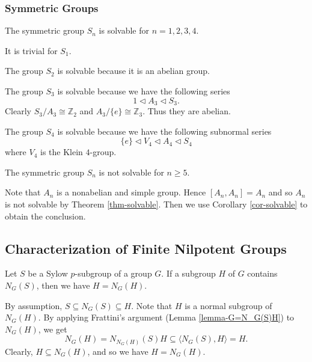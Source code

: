 \subsubsection{Symmetric Groups}
\begin{proposition}
	The symmetric group $S_n$ is solvable for $n=1,2,3,4$.
\end{proposition}
\begin{sketch} It is trivial for $S_1$.
	

	The group $S_2$ is solvable because it is an abelian group.
	
	The group $S_3$ is solvable because we have the following series
	\begin{equation*}
		1 \lhd A_3 \lhd S_3.
	\end{equation*}
	Clearly  $S_3/A_3\cong \mathbb{Z}_2$ and $A_3/\{e\} \cong \mathbb{Z}_3$. Thus they are abelian.  
	
	The group $S_4$ is solvable because we have the following subnormal series
	\begin{equation*}
		\{e\} \lhd V_4 \lhd A_4\lhd S_4
	\end{equation*}
	where $V_4$ is the Klein $4$-group.
\end{sketch}
\begin{proposition}
	The symmetric group $S_n$ is not solvable for $n\geq 5$.
\end{proposition}
\begin{sketch}
	Note that $A_n$ is a nonabelian and simple group. Hence $[A_n,A_n] = A_n$ and so $A_n$ is not solvable by Theorem \ref{thm-solvable}. Then we use Corollary \ref{cor-solvable} to obtain the conclusion.
\end{sketch}

\subsection{Characterization of Finite Nilpotent Groups}



\begin{lemma} \label{lemma-H=N_G(H)}
	Let $S$ be a Sylow $p$-subgroup of a group $G$. If a subgroup $H$ of $G$ contains $N_G(S)$, then we have $H = N_G(H)$.
\end{lemma}
\begin{sketch}
	By assumption, $S \subseteq N_G(S) \subseteq H$. Note that $H$ is a normal subgroup of $N_G(H)$. By applying Frattini's argument (Lemma \ref{lemma-G=N_G(S)H}) to $N_G(H)$, we  get
	$$N_G(H) = N_{N_G(H)}(S)H \subseteq \langle N_G(S), H \rangle = H.$$
	Clearly, $H \subseteq N_G(H)$, and so we have $H = N_G(H)$.
\end{sketch}

